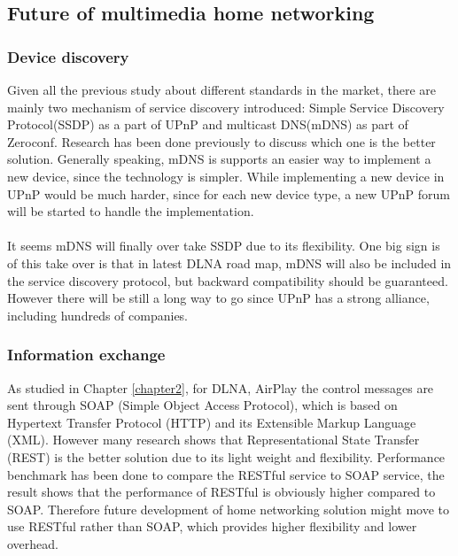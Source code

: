 \subsection{Future of multimedia home networking}
\subsubsection{Device discovery}
Given all the previous study about different standards in the market, there are mainly two mechanism of service discovery introduced: Simple Service Discovery Protocol(SSDP) as a part of UPnP and multicast DNS(mDNS) as part of Zeroconf. Research \cite{zeroconf_vs_upnp} has been done previously to discuss which one is the better solution. Generally speaking, mDNS is supports an easier way to implement a new device, since the technology is simpler. While implementing a new device in UPnP would be much harder, since for each new device type, a new UPnP forum will be started to handle the implementation.\\
\\
It seems mDNS will finally over take SSDP due to its flexibility. One big sign is of this take over is that in latest DLNA road map, mDNS will also be included in the service discovery protocol, but backward compatibility should be guaranteed. However there will be still a long way to go since UPnP has a strong alliance, including hundreds of companies.
\subsubsection{Information exchange}
As studied in Chapter \ref{chapter2}, for DLNA, AirPlay the control messages are sent through SOAP (Simple Object Access Protocol), which is based on Hypertext Transfer Protocol (HTTP) and its Extensible Markup Language (XML). However many research \cite{restful_webservice} shows that Representational State Transfer (REST) is the better solution due to its light weight and flexibility. Performance benchmark \cite{performance_restful_saop} has been done to compare the RESTful service to SOAP service, the result shows that the performance of RESTful is obviously higher compared to SOAP. Therefore future development of home networking solution might move to use RESTful rather than SOAP, which provides higher flexibility and lower overhead.
